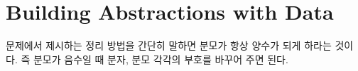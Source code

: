 \chapter{\Large{Building Abstractions with Data}}


문제에서 제시하는 정리 방법을 간단히 말하면 분모가 항상 양수가 되게 하라는
것이다. 즉 분모가 음수일 때 분자, 분모 각각의 부호를 바꾸어 주면 된다.







